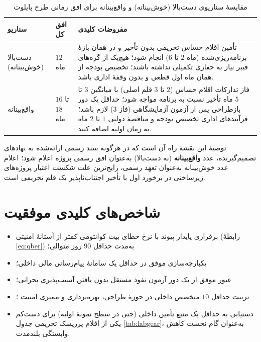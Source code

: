 \begin{table}[htbp]
\centering
\caption{مقایسهٔ سناریوی دست‌بالا (خوش‌بینانه) و واقع‌بینانه برای افق زمانی طرح پایلوت}
\label{tab:scenario}
\small
\begin{tabular}{p{2.8cm}p{2.2cm}p{8.5cm}}
\toprule
\textbf{سناریو} & \textbf{افق کل} & \textbf{مفروضات کلیدی} \\
\midrule
دست‌بالا (خوش‌بینانه) & $12$ ماه & تأمین اقلام حساس تحریمی بدون تأخیر و در همان بازهٔ برنامه‌ریزی‌شده (ماه $2$ تا $6$) انجام شود؛ هیچ‌یک از گره‌های فیبر نیاز به حفاری تکمیلی نداشته باشند؛ تخصیص بودجه از همان ماه اول قطعی و بدون وقفهٔ اداری باشد. \\
واقع‌بینانه & $16$ تا $18$ ماه & فاز تدارکات اقلام حساس ($2$ تا $3$ قلم اصلی) با میانگین $3$ تا $5$ ماه تأخیر نسبت به برنامه مواجه شود؛ حداقل یک دور بازطراحی پس از آزمون آزمایشگاهی (فاز $3$) لازم باشد؛ فرآیندهای اداری تخصیص بودجه و مناقصهٔ دولتی $1$ تا $2$ ماه به زمان اولیه اضافه کنند. \\
\bottomrule
\end{tabular}
\end{table}

توصیهٔ این نقشهٔ راه آن است که در هرگونه سند رسمی ارائه‌شده به نهادهای تصمیم‌گیرنده، عدد \textbf{واقع‌بینانه} (نه دست‌بالا) به‌عنوان افق رسمی پروژه اعلام شود؛ اعلام عدد خوش‌بینانه به‌عنوان تعهد رسمی، رایج‌ترین علت شکست اعتبار پروژه‌های زیرساختی در برخورد اول با تأخیر اجتناب‌ناپذیر یک قلم تحریمی است.

\section{شاخص‌های کلیدی موفقیت }

\begin{itemize}
\item برقراری پایدار پیوند  با نرخ خطای بیت کوانتومی کمتر از آستانهٔ امنیتی (رابطهٔ \ref{eq:qber}) به‌مدت حداقل $90$ روز متوالی؛
\item یکپارچه‌سازی موفق  در حداقل یک سامانهٔ پیام‌رسانی مالی داخلی؛
\item عبور موفق از یک دور آزمون نفوذ مستقل بدون یافتن آسیب‌پذیری بحرانی؛
\item تربیت حداقل $10$ متخصص داخلی در حوزهٔ طراحی، بهره‌برداری و ممیزی امنیت ؛
\item دستیابی به حداقل یک منبع تأمین داخلی (حتی در سطح نمونهٔ اولیه) برای دست‌کم یکی از اقلام پرریسک تحریمی جدول \ref{tab:labgear}، به‌عنوان گام نخست کاهش وابستگی بلندمدت.
\end{itemize}

